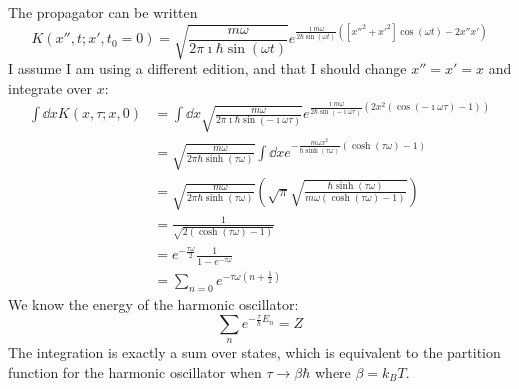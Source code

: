 \documentclass[a4paper,twoside]{article}
\begin{document}
\begin{problem}
    The propagator can be written
    \begin{equation}
        K(x'', t; x', t_0 = 0) = \sqrt{\frac{m \omega}{2 \pi \imath \hbar \sin(\omega t)}} e^{\frac{\imath m \omega}{2 \hbar \sin(\omega t)}\left( [{x''}^2 + {x'}^2] \cos(\omega t) - 2x''x' \right)}
    \end{equation}
    I assume I am using a different edition, and that I should change $ x'' = x' = x $ and integrate over $ x $:
    \begin{align}
        \int \dd{x} K(x, \tau; x, 0) &= \int \dd{x} \sqrt{\frac{m \omega}{2 \pi \imath \hbar \sin(- \imath \omega \tau)}} e^{\frac{\imath m \omega}{2 \hbar \sin(- \imath \omega \tau)} \left( 2x^2 (\cos(- \imath \omega \tau) - 1) \right)} \\
        &= \sqrt{\frac{m \omega}{2 \pi \hbar \sinh(\tau \omega)}} \int \dd{x} e^{- \frac{m \omega x^2}{\hbar \sinh(\tau \omega)} (\cosh(\tau \omega) - 1)} \\
        &=  \sqrt{\frac{m \omega}{2 \pi \hbar \sinh(\tau \omega)}} \left( \sqrt{\pi} \sqrt{\frac{\hbar \sinh(\tau \omega)}{m \omega (\cosh(\tau \omega) - 1)}} \right) \\
        &= \frac{1}{\sqrt{2(\cosh(\tau \omega) - 1)}} \\
        &= e^{- \frac{\tau \omega}{2}} \frac{1}{1 - e^{- \tau \omega}} \\
        &= \sum_{n=0} e^{- \tau \omega \left( n + \frac{1}{2} \right)}
    \end{align}
    We know the energy of the harmonic oscillator:
    \begin{equation}
        \sum_n e^{- \frac{\tau}{\hbar} E_n} = Z
    \end{equation}
    The integration is exactly a sum over states, which is equivalent to the partition function for the harmonic oscillator when $ \tau \to \beta \hbar $ where $ \beta = k_B T $.
\end{problem}
\end{document}
